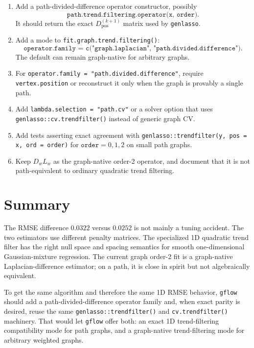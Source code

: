 \documentclass[11pt]{article}
\begin{document}
\begin{enumerate}
  \item Add a path-divided-difference operator constructor, possibly
        \[
          \texttt{path.trend.filtering.operator(x,\ order)}.
        \]
        It should return the exact \(D^{(k+1)}_{\mathrm{pos}}\) matrix used by
        \texttt{genlasso}.

  \item Add a mode to \texttt{fit.graph.trend.filtering()}:
        \[
          \texttt{operator.family = c("graph.laplacian", "path.divided.difference")}.
        \]
        The default can remain graph-native for arbitrary graphs.

  \item For \texttt{operator.family = "path.divided.difference"}, require
        \texttt{vertex.position} or reconstruct it only when the graph is
        provably a single path.

  \item Add \texttt{lambda.selection = "path.cv"} or a solver option that uses
        \texttt{genlasso::cv.trendfilter()} instead of generic graph CV.

  \item Add tests asserting exact agreement with
        \texttt{genlasso::trendfilter(y, pos = x, ord = order)} for
        \(\texttt{order}=0,1,2\) on small path graphs.

  \item Keep \(D_wL_w\) as the graph-native order-2 operator, and document that
        it is not path-equivalent to ordinary quadratic trend filtering.
\end{enumerate}

\section{Summary}

The RMSE difference \(0.0322\) versus \(0.0252\) is not mainly a tuning
accident.  The two estimators use different penalty matrices.  The specialized
1D quadratic trend filter has the right null space and spacing semantics for
smooth one-dimensional Gaussian-mixture regression.  The current graph order-2
fit is a graph-native Laplacian-difference estimator; on a path, it is close in
spirit but not algebraically equivalent.

To get the same algorithm and therefore the same 1D RMSE behavior, \texttt{gflow}
should add a path-divided-difference operator family and, when exact parity is
desired, reuse the same \texttt{genlasso::trendfilter()} and
\texttt{cv.trendfilter()} machinery.  That would let \texttt{gflow} offer both:
an exact 1D trend-filtering compatibility mode for path graphs, and a
graph-native trend-filtering mode for arbitrary weighted graphs.
\end{document}
